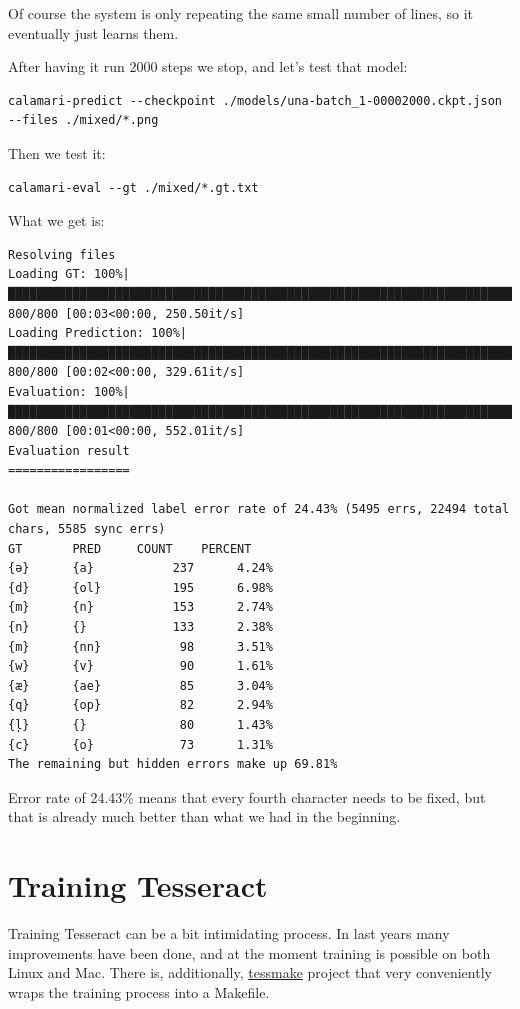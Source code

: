 \documentclass[]{book}
\begin{document}
Of course the system is only repeating the same small number of lines, so it eventually just learns them.

After having it run 2000 steps we stop, and let's test that model:

\begin{verbatim}
calamari-predict --checkpoint ./models/una-batch_1-00002000.ckpt.json --files ./mixed/*.png
\end{verbatim}

Then we test it:

\begin{verbatim}
calamari-eval --gt ./mixed/*.gt.txt
\end{verbatim}

What we get is:

\begin{verbatim}
Resolving files
Loading GT: 100%|███████████████████████████████████████████████████████████████████████████████████████| 800/800 [00:03<00:00, 250.50it/s]
Loading Prediction: 100%|███████████████████████████████████████████████████████████████████████████████| 800/800 [00:02<00:00, 329.61it/s]
Evaluation: 100%|███████████████████████████████████████████████████████████████████████████████████████| 800/800 [00:01<00:00, 552.01it/s]
Evaluation result
=================

Got mean normalized label error rate of 24.43% (5495 errs, 22494 total chars, 5585 sync errs)
GT       PRED     COUNT    PERCENT   
{ə}      {a}           237      4.24%
{d}      {ol}          195      6.98%
{m}      {n}           153      2.74%
{n}      {}            133      2.38%
{m}      {nn}           98      3.51%
{w}      {v}            90      1.61%
{æ}      {ae}           85      3.04%
{q}      {op}           82      2.94%
{ļ}      {}             80      1.43%
{c}      {o}            73      1.31%
The remaining but hidden errors make up 69.81%
\end{verbatim}

Error rate of 24.43\% means that every fourth character needs to be fixed, but that is already much better than what we had in the beginning.

\hypertarget{training-tesseract}{%
\section{Training Tesseract}\label{training-tesseract}}

Training Tesseract can be a bit intimidating process. In last years many improvements have been done, and at the moment training is possible on both Linux and Mac. There is, additionally, \href{https://github.com/tesseract-ocr/tesstrain}{tessmake} project that very conveniently wraps the training process into a Makefile.
\end{document}
